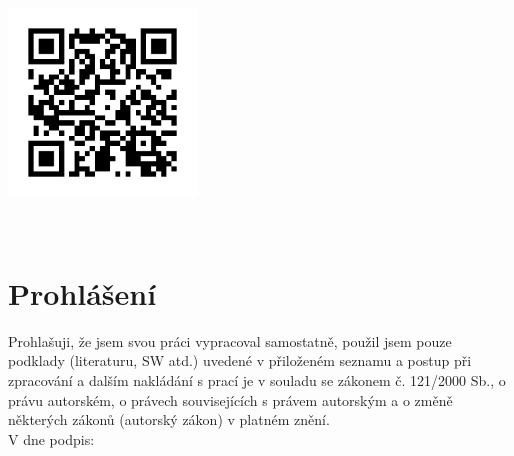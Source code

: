 \setcounter{page}{1}
\thispagestyle{empty}

\newpage


~\\[3cm]
\begin{center}
\includegraphics[width=5cm]{img/github-head-qr}
\end{center}


~\\[7cm]
\section*{Prohlášení}

Prohlašuji, že jsem svou práci vypracoval samostatně, použil jsem pouze
podklady (literaturu, SW atd.) uvedené v přiloženém seznamu a postup při
zpracování a dalším nakládání s prací je v souladu se zákonem č. 121/2000 Sb.,
o právu autorském, o právech souvisejících s právem autorským a o změně
některých zákonů (autorský zákon) v platném znění.\\[0.7cm]

V \makebox[3cm]{\dotfill} dne \makebox[4cm]{\dotfill}
podpis: \makebox[6cm]{\dotfill}

\newpage

~

\newpage
